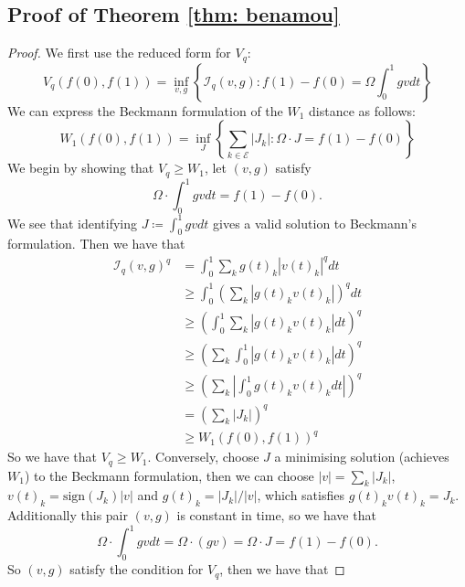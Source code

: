 \documentclass[conference]{IEEEtran}
\newcommand{\EE}{\mathcal{E}}
\theoremstyle{ieeestyle}
\begin{document}
\subsection{Proof of Theorem \ref{thm: benamou}}\label{appendix: thm: benamou}
\begin{proof}
    We first use the reduced form for $V_q$:
    \begin{equation*}
        V_q(f(0),f(1))= \inf_{v,g} \left\{ \mathcal{I}_q(v,g) : f(1) - f(0) = \Omega \textstyle \int_0^1 gv dt \right\}
    \end{equation*}
    We can express the Beckmann formulation of the $W_1$ distance as follows:
    \begin{equation*}
        W_1(f(0),f(1)) = \inf_J \left\{\sum_{k \in \EE} |J_k| : \Omega \cdot J = f(1) - f(0) \right \}
    \end{equation*}
    We begin by showing that $V_q \geq W_1$, let $(v,g)$ satisfy
    \begin{equation*}
        \Omega \cdot \int_0^1 gv dt = f(1) - f(0).
    \end{equation*}
    We see that identifying $J \coloneqq \int_0^1 gv dt$ gives a valid solution to Beckmann's formulation. Then we have that 
    \begin{align*}
        \mathcal{I}_q(v,g)^q &= \int_0^1 \sum_{k} g(t)_k|v(t)_k|^q dt \\
        &\geq \int_0^1 \left( \sum_k |g(t)_kv(t)_k| \right)^q dt \\
        &\geq \left( \int_0^1 \sum_k |g(t)_kv(t)_k| dt\right)^q\\
        &\geq \left( \sum_k \int_0^1 |g(t)_kv(t)_k| dt \right)^q \\
        &\geq \left(\sum_k \left|\int_0^1 g(t)_kv(t)_k  dt\right| \right)^q\\
        &= \left( \sum_k |J_k|\right)^q \\
        &\geq W_1(f(0),f(1))^q
    \end{align*}
    So we have that $V_q \geq W_1$. Conversely, choose $J$ a minimising solution (achieves $W_1$) to the Beckmann formulation, then we can choose 
    $|v| = \sum_{k} |J_k|$, $v(t)_k = \text{sign}(J_k)|v|$ and $g(t)_k = |J_k|/|v|$, which satisfies $g(t)_k v(t)_k = J_k$. Additionally this pair $(v,g)$ is constant in time, so we have that 
    \begin{equation*}
        \Omega \cdot \int_0^1 gv dt = \Omega \cdot (gv) = \Omega \cdot J = f(1) - f(0).
    \end{equation*}
    So $(v,g)$ satisfy the condition for $V_q$, then we have that 

\end{proof}
\end{document}
